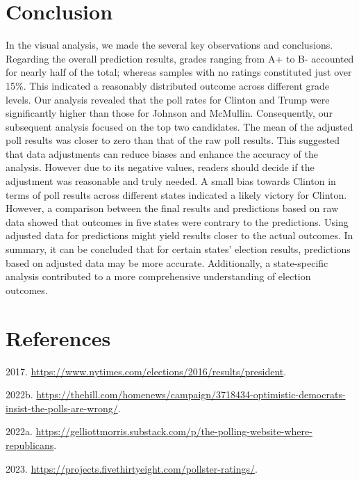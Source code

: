 \documentclass[
  11pt,
]{article}
\newlength{\cslhangindent}
\newlength{\cslentryspacingunit} %
\newenvironment{CSLReferences}[2] %
 {%
  \setlength{\parindent}{0pt}
  \ifodd #1
  \let\oldpar\par
  \def\par{\hangindent=\cslhangindent\oldpar}
  \fi
  \setlength{\parskip}{#2\cslentryspacingunit}
 }%
 {}
\begin{document}
\hypertarget{conclusion}{%
\section{Conclusion}\label{conclusion}}

In the visual analysis, we made the several key observations and
conclusions. Regarding the overall prediction results, grades ranging
from A+ to B- accounted for nearly half of the total; whereas samples
with no ratings constituted just over 15\%. This indicated a reasonably
distributed outcome across different grade levels. Our analysis revealed
that the poll rates for Clinton and Trump were significantly higher than
those for Johnson and McMullin. Consequently, our subsequent analysis
focused on the top two candidates. The mean of the adjusted poll results
was closer to zero than that of the raw poll results. This suggested
that data adjustments can reduce biases and enhance the accuracy of the
analysis. However due to its negative values, readers should decide if
the adjustment was reasonable and truly needed. A small bias towards
Clinton in terms of poll results across different states indicated a
likely victory for Clinton. However, a comparison between the final
results and predictions based on raw data showed that outcomes in five
states were contrary to the predictions. Using adjusted data for
predictions might yield results closer to the actual outcomes. In
summary, it can be concluded that for certain states' election results,
predictions based on adjusted data may be more accurate. Additionally, a
state-specific analysis contributed to a more comprehensive
understanding of election outcomes.

\hypertarget{references}{%
\section*{References}\label{references}}

\hypertarget{refs}{}
\begin{CSLReferences}{1}{0}
\leavevmode{}%
2017. \url{https://www.nytimes.com/elections/2016/results/president}.

\leavevmode{}%
2022b.
\url{https://thehill.com/homenews/campaign/3718434-optimistic-democrats-insist-the-polls-are-wrong/}.

\leavevmode{}%
2022a.
\url{https://gelliottmorris.substack.com/p/the-polling-website-where-republicans}.

\leavevmode{}%
2023. \url{https://projects.fivethirtyeight.com/pollster-ratings/}.

\end{CSLReferences}
\end{document}
